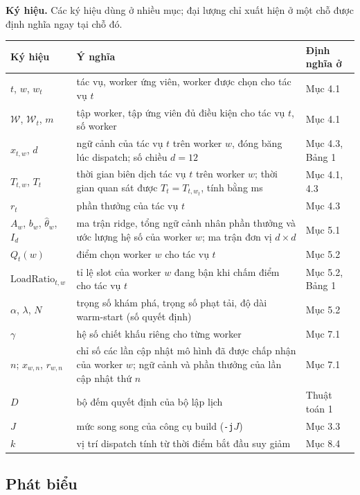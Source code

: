 \documentclass[final,5p,times,twocolumn]{elsarticle}
\begin{document}
\begin{table}[H]
\footnotesize
\setlength{\tabcolsep}{3pt}
\noindent\textbf{Ký hiệu.} Các ký hiệu dùng ở nhiều mục; đại lượng chỉ xuất hiện ở một chỗ được định nghĩa ngay tại chỗ đó.\\[3pt]
\begin{tabular}{@{}p{2.15cm}p{4.75cm}p{1.45cm}@{}}
\toprule
Ký hiệu & Ý nghĩa & Định nghĩa ở \\
\midrule
$t$, $w$, $w_t$ & tác vụ, worker ứng viên, worker được chọn cho tác vụ $t$ & Mục 4.1 \\
$\mathcal{W}$, $\mathcal{W}_t$, $m$ & tập worker, tập ứng viên đủ điều kiện cho tác vụ $t$, số worker & Mục 4.1 \\
$x_{t,w}$, $d$ & ngữ cảnh của tác vụ $t$ trên worker $w$, đóng băng lúc dispatch; số chiều $d=12$ & Mục 4.3, Bảng 1 \\
$T_{t,w}$, $T_t$ & thời gian biên dịch tác vụ $t$ trên worker $w$; thời gian quan sát được $T_t=T_{t,w_t}$, tính bằng ms & Mục 4.1, 4.3 \\
$r_t$ & phần thưởng của tác vụ $t$ & Mục 4.3 \\
$A_w$, $b_w$, $\hat\theta_w$, $I_d$ & ma trận ridge, tổng ngữ cảnh nhân phần thưởng và ước lượng hệ số của worker $w$; ma trận đơn vị $d\times d$ & Mục 5.1 \\
$Q_t(w)$ & điểm chọn worker $w$ cho tác vụ $t$ & Mục 5.2 \\
$\text{LoadRatio}_{t,w}$ & tỉ lệ slot của worker $w$ đang bận khi chấm điểm cho tác vụ $t$ & Mục 5.2, Bảng 1 \\
$\alpha$, $\lambda$, $N$ & trọng số khám phá, trọng số phạt tải, độ dài warm-start (số quyết định) & Mục 5.2 \\
$\gamma$ & hệ số chiết khấu riêng cho từng worker & Mục 7.1 \\
$n$; $x_{w,n}$, $r_{w,n}$ & chỉ số các lần cập nhật mô hình đã được chấp nhận của worker $w$; ngữ cảnh và phần thưởng của lần cập nhật thứ $n$ & Mục 7.1 \\
$D$ & bộ đếm quyết định của bộ lập lịch & Thuật toán 1 \\
$J$ & mức song song của công cụ build (\texttt{-j}$J$) & Mục 3.3 \\
$k$ & vị trí dispatch tính từ thời điểm bắt đầu suy giảm & Mục 8.4 \\
\bottomrule
\end{tabular}
\end{table}

\subsection{Phát biểu}
\end{document}
